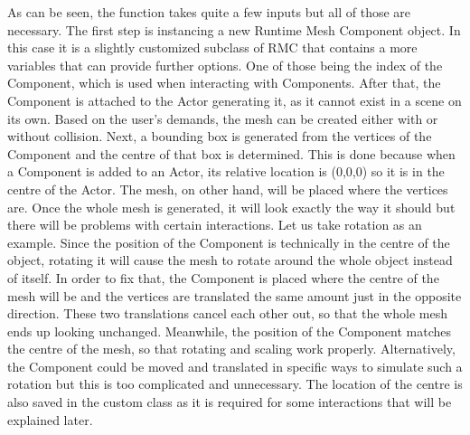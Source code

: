 As can be seen, the function takes quite a few inputs but all of those are necessary. The first step is instancing a new Runtime Mesh Component object. In this case it is a slightly customized subclass of \acs{RMC} that contains a more variables that can provide further options. One of those being the index of the Component, which is used when interacting with Components. After that, the Component is attached to the Actor generating it, as it cannot exist in a scene on its own. Based on the user's demands, the mesh can be created either with or without collision. Next, a bounding box is generated from the vertices of the Component and the centre of that box is determined. This is done because when a Component is added to an Actor, its relative location is (0,0,0) so it is in the centre of the Actor. The mesh, on other hand, will be placed where the vertices are. Once the whole mesh is generated, it will look exactly the way it should but there will be problems with certain interactions. Let us take rotation as an example. Since the position of the Component is technically in the centre of the object, rotating it will cause the mesh to rotate around the whole object instead of itself. In order to fix that, the Component is placed where the centre of the mesh will be and the vertices are translated the same amount just in the opposite direction. These two translations cancel each other out, so that the whole mesh ends up looking unchanged. Meanwhile, the position of the Component matches the centre of the mesh, so that rotating and scaling work properly. Alternatively, the Component could be moved and translated in specific ways to simulate such a rotation but this is too complicated and unnecessary. The location of the centre is also saved in the custom class as it is required for some interactions that will be explained later.\\
